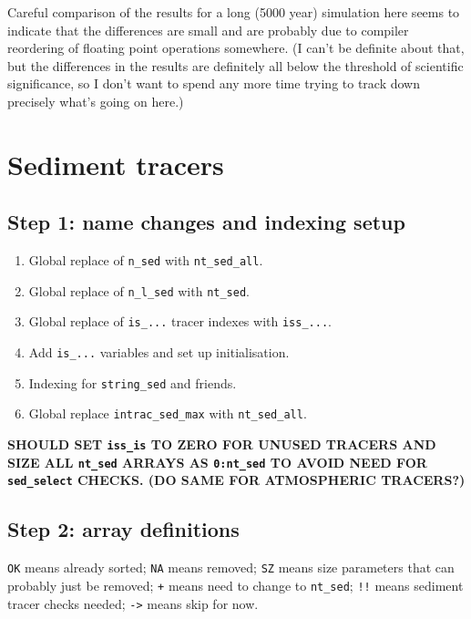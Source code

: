 \documentclass[a4paper,10pt,article]{memoir}
\begin{document}
Careful comparison of the results for a long (5000 year) simulation
here seems to indicate that the differences are small and are probably
due to compiler reordering of floating point operations somewhere.  (I
can't be definite about that, but the differences in the results are
definitely all below the threshold of scientific significance, so I
don't want to spend any more time trying to track down precisely
what's going on here.)

\section{Sediment tracers}

\subsection{Step 1: name changes and indexing setup}

\begin{enumerate}
  \item{Global replace of \texttt{n\_sed} with \texttt{nt\_sed\_all}.}
  \item{Global replace of \texttt{n\_l\_sed} with \texttt{nt\_sed}.}
  \item{Global replace of \texttt{is\_...} tracer indexes with
    \texttt{iss\_...}.}
  \item{Add \texttt{is\_...} variables and set up initialisation.}
  \item{Indexing for \texttt{string\_sed} and friends.}
  \item{Global replace \texttt{intrac\_sed\_max} with \texttt{nt\_sed\_all}.}
\end{enumerate}

\textbf{SHOULD SET \texttt{iss\_is} TO ZERO FOR UNUSED TRACERS AND
  SIZE ALL \texttt{nt\_sed} ARRAYS AS \texttt{0:nt\_sed} TO AVOID NEED
  FOR \texttt{sed\_select} CHECKS.  (DO SAME FOR ATMOSPHERIC
  TRACERS?)}

\subsection{Step 2: array definitions}

\texttt{OK} means already sorted; \texttt{NA} means removed;
\texttt{SZ} means size parameters that can probably just be removed;
\texttt{+} means need to change to \texttt{nt\_sed}; \texttt{!!} means
sediment tracer checks needed; \texttt{->} means skip for now.
\end{document}
